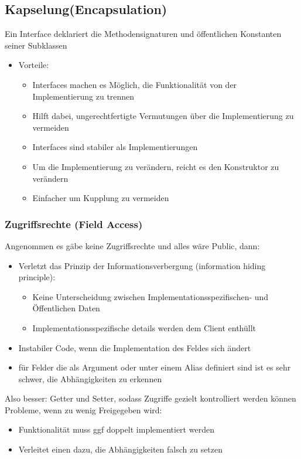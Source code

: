 \documentclass[ngerman,color=3b]{tuda_summary}
\begin{document}
\subsection{Kapselung(Encapsulation)}
\begin{definition}
    Ein Interface deklariert die Methodensignaturen und öffentlichen Konstanten seiner Subklassen
\end{definition}
\begin{itemize}
    \item Vorteile:\begin{itemize}
              \item Interfaces machen es Möglich, die Funktionalität von der Implementierung zu trennen
              \item Hilft dabei, ungerechtfertigte Vermutungen über die Implementierung zu vermeiden
              \item Interfaces sind stabiler als Implementierungen
              \item Um die Implementierung zu verändern, reicht es den Konstruktor zu verändern
              \item Einfacher um Kupplung zu vermeiden
          \end{itemize}
\end{itemize}
\clearpage
\subsubsection{Zugriffsrechte (Field Access)}
Angenommen es gäbe keine Zugriffsrechte und alles wäre Public, dann:
\begin{itemize}
    \item Verletzt das Prinzip der Informationsverbergung (information hiding principle):\begin{itemize}
              \item Keine Unterscheidung zwischen Implementationsspezifischen- und Öffentlichen Daten
              \item Implementationsspezifische details werden dem Client enthüllt
          \end{itemize}
    \item Instabiler Code, wenn die Implementation des Feldes sich ändert
    \item für Felder die als Argument oder unter einem Alias definiert sind ist es sehr schwer, die Abhängigkeiten zu erkennen
\end{itemize}
Also besser: Getter und Setter, sodass Zugriffe gezielt kontrolliert werden können
Probleme, wenn zu wenig Freigegeben wird:\begin{itemize}
    \item Funktionalität muss ggf doppelt implementiert werden
    \item Verleitet einen dazu, die Abhängigkeiten falsch zu setzen
\end{itemize}
\end{document}
